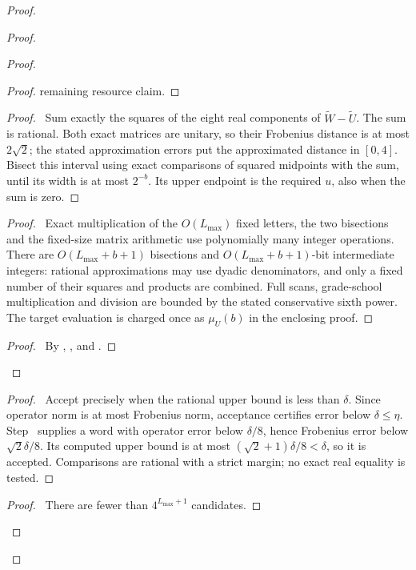 \begin{proof}
\begin{proof}
\begin{proof}
\begin{proof}
 remaining resource claim.\end{proof}
 \begin{proof}\pf\ Sum exactly the squares of the eight real
 components of $\widetilde W-\widetilde U$. The sum is rational.
 Both exact matrices are unitary, so their Frobenius distance is at
 most $2\sqrt2$; the stated approximation errors put the approximated
 distance in $[0,4]$. Bisect this interval using exact comparisons
 of squared midpoints with the sum, until its width is at most
 $2^{-b}$. Its upper endpoint is the required $u$, also when the
 sum is zero.\end{proof}
 \begin{proof}\pf\ Exact multiplication of the $O(L_{\max})$ fixed
 letters, the two bisections and the fixed-size matrix arithmetic
 use polynomially many integer operations. There are $O(L_{\max}+b+1)$
 bisections and $O(L_{\max}+b+1)$-bit intermediate integers: rational
 approximations may use dyadic denominators, and only a fixed
 number of their squares and products are combined. Full scans,
 grade-school multiplication and division are bounded by the stated
 conservative sixth power. The target evaluation is charged once
 as $\mu_U(b)$ in the enclosing proof.\end{proof}
 \qedstep
 \begin{proof}\pf\ By ,
 ,
  and
 .\end{proof}
\end{proof}
  \begin{proof}\pf\ Accept precisely when the rational upper bound
  is less than $\delta$. Since operator norm is at most Frobenius
  norm, acceptance certifies error below $\delta\leq\eta$.
  Step~ supplies a word with operator error
  below $\delta/8$, hence Frobenius error below
  $\sqrt2\delta/8$. Its computed upper bound is at most
  $(\sqrt2+1)\delta/8<\delta$, so it is accepted. Comparisons
  are rational with a strict margin; no exact real equality is tested.
  \end{proof}
  \qedstep
  \begin{proof}\pf\ There are fewer than $4^{L_{\max}+1}$ candidates.

\end{proof}
\end{proof}
\end{proof}
